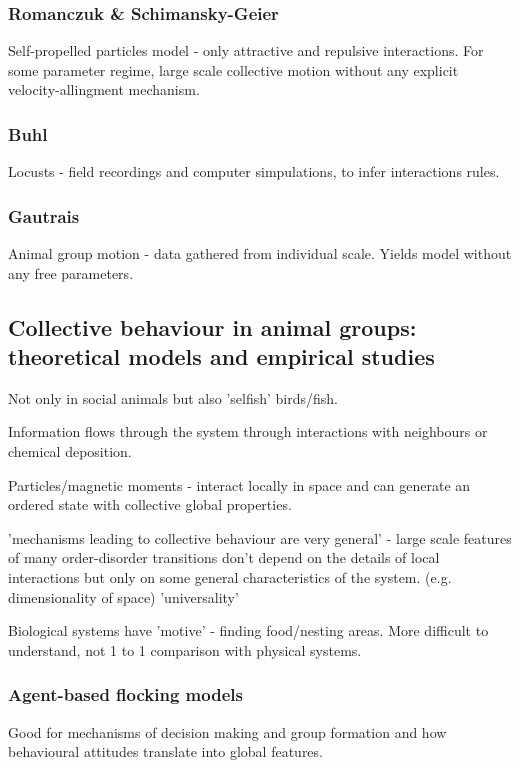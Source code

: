 \documentclass[10pt,twocolumn]{revtex4-2}    %
\begin{document}
\subsubsection{Romanczuk \& Schimansky-Geier}
Self-propelled particles model - only attractive and repulsive interactions. For some parameter regime, large scale collective motion without any explicit velocity-allingment mechanism.

\subsubsection{Buhl}
Locusts - field recordings and computer simpulations, to infer interactions rules.

\subsubsection{Gautrais}
Animal group motion - data gathered from individual scale. Yields model without any free parameters. 



\subsection{Collective behaviour in animal groups: theoretical models and empirical studies}

Not only in social animals but also 'selfish' birds/fish.

Information flows through the system through interactions with neighbours or chemical deposition.

Particles/magnetic moments - interact locally in space and can generate an ordered state with collective global properties.

'mechanisms leading to collective behaviour are very general' - large scale features of many order-disorder transitions don't depend on the details of local interactions but only on some general characteristics of the system. (e.g. dimensionality of space) 'universality'

Biological systems have 'motive' - finding food/nesting areas. More difficult to understand, not 1 to 1 comparison with physical systems.

\subsubsection{Agent-based flocking models}

Good for mechanisms of decision making and group formation and how behavioural attitudes translate into global features.
\end{document}
